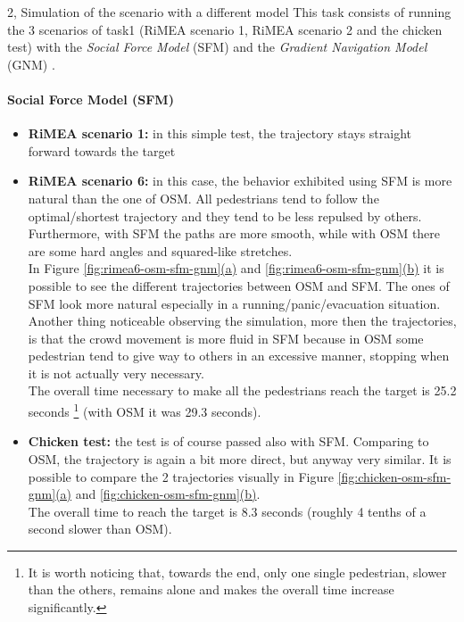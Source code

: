 \documentclass[10pt,a4paper]{article}
\begin{document}
\begin{task}{2, Simulation of the scenario with a different model}
This task consists of running the 3 scenarios of task1 (RiMEA scenario 1, RiMEA scenario 2 and the chicken test) with the \textit{Social Force Model} (SFM) \cite{sfm1, sfm2} and the \textit{Gradient Navigation Model} (GNM) \cite{gnm, bridging-the-gap}.

\paragraph{Social Force Model (SFM)}
\begin{itemize}
    \item \textbf{RiMEA scenario 1:} in this simple test, the trajectory stays straight forward towards the target
    
    \item \textbf{RiMEA scenario 6:} in this case, the behavior exhibited using SFM is more natural than the one of OSM.
    All pedestrians tend to follow the optimal/shortest trajectory and they tend to be less repulsed by others.
    Furthermore, with SFM the paths are more smooth, while with OSM there are some hard angles and squared-like stretches.\\
    In Figure \hyperref[fig:rimea6-osm-sfm-gnm]{\ref{fig:rimea6-osm-sfm-gnm}(a)} and \hyperref[fig:rimea6-osm-sfm-gnm]{\ref{fig:rimea6-osm-sfm-gnm}(b)} it is possible to see the different trajectories between OSM and SFM.
    The ones of SFM look more natural especially in a running/panic/evacuation situation.\\
    Another thing noticeable observing the simulation, more then the trajectories, is that the crowd movement is more fluid in SFM because in OSM some pedestrian tend to give way to others in an excessive manner, stopping when it is not actually very necessary.\\
    The overall time necessary to make all the pedestrians reach the target is 25.2 seconds
    \footnote{It is worth noticing that, towards the end, only one single pedestrian, slower than the others, remains alone and makes the overall time increase significantly.}
    (with OSM it was 29.3 seconds).
    
    \item \textbf{Chicken test:} the test is of course passed also with SFM.
    Comparing to OSM, the trajectory is again a bit more direct, but anyway very similar.
    It is possible to compare the 2 trajectories visually in Figure \hyperref[fig:chicken-osm-sfm-gnm]{\ref{fig:chicken-osm-sfm-gnm}(a)} and \hyperref[fig:chicken-osm-sfm-gnm]{\ref{fig:chicken-osm-sfm-gnm}(b)}.\\
    The overall time to reach the target is 8.3 seconds (roughly 4 tenths of a second slower than OSM).
\end{itemize}


\end{task}
\end{document}
